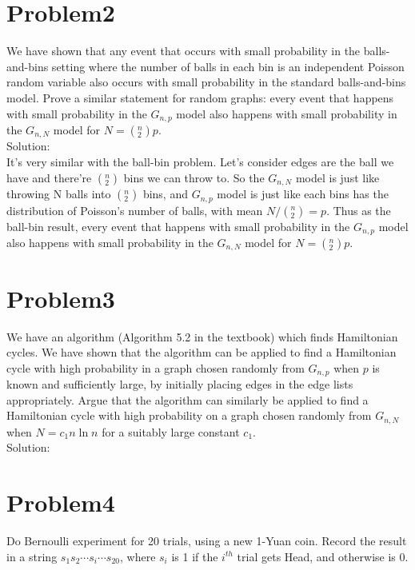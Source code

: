 \documentclass[12pt]{article}
\begin{document}
\section{Problem2}
We have shown that any event that occurs with small probability in the balls-and-bins setting where the number of balls in each bin is an independent Poisson random variable also occurs with small probability in the standard balls-and-bins model. Prove a similar statement for random graphs: every event that happens with small probability in the $G_{n,p}$ model also happens with small probability in the $G_{n,N}$ model for $N = ({}^n_2)p$.\\

Solution:\\
It's very similar with the ball-bin problem. Let's consider edges are the ball we have and there're $({}^n_2)$ bins we can throw to. So the $G_{n,N}$ model is just like throwing N balls into $({}^n_2)$ bins, and $G_{n,p}$ model is just like each bins has the distribution of Poisson's number of balls, with mean $N/({}^n_2)=p$. Thus as the ball-bin result, every event that happens with small probability in the $G_{n,p}$ model also happens with small probability in the $G_{n,N}$ model for $N = ({}^n_2)p$.

\section{Problem3}
We have an algorithm (Algorithm 5.2 in the textbook) which finds Hamiltonian cycles. We have shown that the algorithm can be applied to find a Hamiltonian cycle with high probability in a graph chosen randomly from $G_{n,p}$ when $p$ is known and sufficiently large, by initially placing edges in the edge lists appropriately. Argue that the algorithm can similarly be applied to find a Hamiltonian cycle with high probability on a graph chosen randomly from $G_{n,N}$ when $N = c_1n \ln n$ for a suitably large constant $c_1$.\\

Solution:\\

\section{Problem4}
Do Bernoulli experiment for 20 trials, using a new 1-Yuan coin. Record the result in a
string $s_1s_2 \cdots s_i \cdots s_{20}$, where $s_i$ is 1 if the $i^{th}$ trial gets Head, and otherwise is 0.
\end{document}
